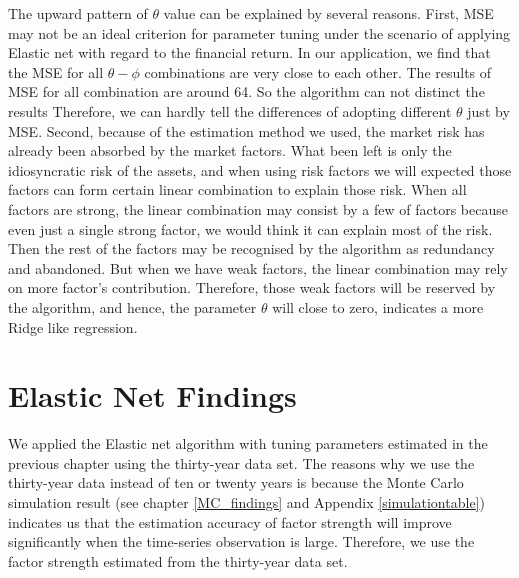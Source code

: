 The upward pattern of $\theta$ value can be explained by several reasons.
First, MSE may not be an ideal criterion for parameter tuning under the scenario of applying Elastic net with regard to the financial return. 
In our application, we find that the MSE for all $\theta - \phi$ combinations are very close to each other.
The results of MSE for all combination are around 64.
So the algorithm can not distinct the results 
Therefore, we can hardly tell the differences of adopting different $\theta$ just by MSE.
Second, because of the estimation method we used, the market risk has already been absorbed by the market factors.
What been left is only the idiosyncratic risk of the assets, and when using risk factors we will expected those factors can form certain linear combination to  explain those risk.
When all factors are strong, the linear combination may consist by a few of factors because even just a single strong factor, we would think it can explain most of the risk.
Then the rest of the factors may be recognised by the algorithm as redundancy and abandoned.
But when we have weak factors, the linear combination may rely on more factor's contribution.
Therefore, those weak factors will be reserved by the algorithm, and hence, the parameter $\theta$ will close to zero, indicates a more Ridge like regression.





\section{Elastic Net Findings}
We applied the Elastic net algorithm with tuning parameters estimated in the previous chapter using the thirty-year data set.
The reasons why we use the thirty-year data instead of ten or twenty years is because the Monte Carlo simulation result (see chapter \ref{MC_findings} and Appendix \ref{simulationtable}) indicates us that the estimation accuracy of factor strength will improve significantly when the time-series observation is large.
Therefore, we use the factor strength estimated from the thirty-year data set.

